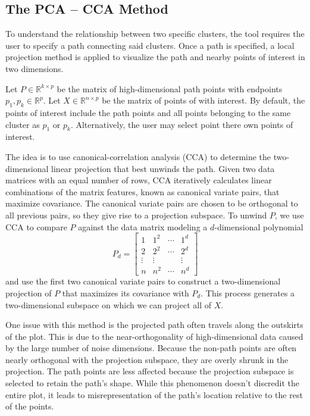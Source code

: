 \documentclass{article}
\begin{document}
\subsection{The PCA -- CCA Method}
To understand the relationship between two specific clusters, the tool requires the user to specify a path connecting said clusters. Once a path is specified, a local projection method is applied to visualize the path and nearby points of interest in two dimensions.

Let $P \in \mathbb{R}^{k \times p}$ be the matrix of high-dimensional path points with endpoints $p_1, p_k \in \mathbb{R}^p$. Let $X \in \mathbb{R}^{n \times p}$ be the matrix of points of with interest. By default, the points of interest include the path points and all points belonging to the same cluster as $p_1$ or $p_k$. Alternatively, the user may select point there own points of interest.

The idea is to use canonical-correlation analysis (CCA) to determine the two-dimensional linear projection that best unwinds the path. Given two data matrices with an equal number of rows, CCA iteratively calculates linear combinations of the matrix features, known as canonical variate pairs, that maximize covariance. The canonical variate pairs are chosen to be orthogonal to all previous pairs, so they give rise to a projection subspace. To unwind $P$, we use CCA to compare $P$ against the data matrix modeling a $d$-dimensional polynomial $$P_d = \begin{bmatrix}
1 & 1^2 & \cdots & 1^d \\
2 & 2^2 & \cdots & 2^d \\
\vdots & \vdots & & \vdots \\
n & n^2 & \cdots & n^d
\end{bmatrix}$$
and use the first two canonical variate pairs to construct a two-dimensional projection of $P$ that maximizes its covariance with $P_d$. This process generates a two-dimensional subspace on which we can project all of $X$.

One issue with this method is the projected path often travels along the outskirts of the plot. This is due to the near-orthogonality of high-dimensional data \cite{near-orthogonal} caused by the large number of noise dimensions. Because the non-path points are often nearly orthogonal with the projection subspace, they are overly shrunk in the projection. The path points are less affected because the projection subspace is selected to retain the path's shape. While this phenomenon doesn't discredit the entire plot, it leads to misrepresentation of the path's location relative to the rest of the points.
\end{document}
